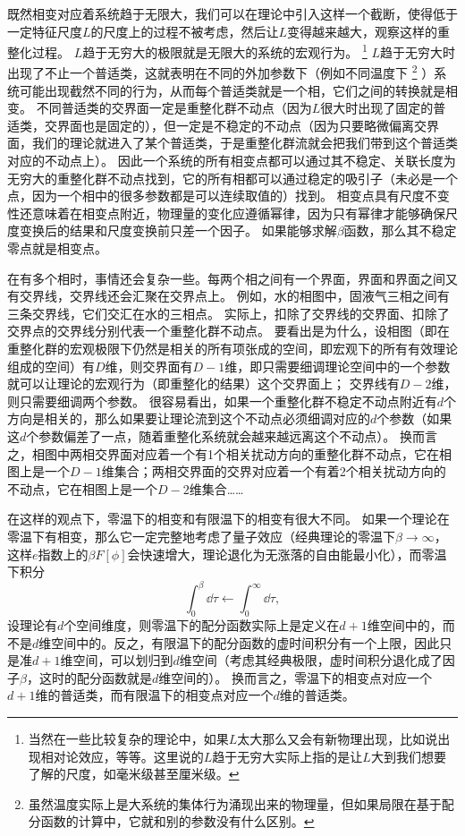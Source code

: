 \documentclass[hyperref, UTF8, a4paper]{ctexart}
\begin{document}
既然相变对应着系统趋于无限大，我们可以在理论中引入这样一个截断，使得低于一定特征尺度$L$的尺度上的过程不被考虑，然后让$L$变得越来越大，观察这样的重整化过程。
$L$趋于无穷大的极限就是无限大的系统的宏观行为。%
\footnote{当然在一些比较复杂的理论中，如果$L$太大那么又会有新物理出现，比如说出现相对论效应，等等。这里说的$L$趋于无穷大实际上指的是让$L$大到我们想要了解的尺度，如毫米级甚至厘米级。}%
$L$趋于无穷大时出现了不止一个普适类，这就表明在不同的外加参数下（例如不同温度下%
\footnote{虽然温度实际上是大系统的集体行为涌现出来的物理量，但如果局限在基于配分函数的计算中，它就和别的参数没有什么区别。}%
）系统可能出现截然不同的行为，从而每个普适类就是一个相，它们之间的转换就是相变。
不同普适类的交界面一定是重整化群不动点（因为$L$很大时出现了固定的普适类，交界面也是固定的），但一定是不稳定的不动点（因为只要略微偏离交界面，我们的理论就进入了某个普适类，于是重整化群流就会把我们带到这个普适类对应的不动点上）。
因此一个系统的所有相变点都可以通过其不稳定、关联长度为无穷大的重整化群不动点找到，它的所有相都可以通过稳定的吸引子（未必是一个点，因为一个相中的很多参数都是可以连续取值的）找到。
相变点具有尺度不变性还意味着在相变点附近，物理量的变化应遵循幂律，因为只有幂律才能够确保尺度变换后的结果和尺度变换前只差一个因子。%
如果能够求解$\beta$函数，那么其不稳定零点就是相变点。

在有多个相时，事情还会复杂一些。每两个相之间有一个界面，界面和界面之间又有交界线，交界线还会汇聚在交界点上。
例如，水的相图中，固液气三相之间有三条交界线，它们交汇在水的三相点。
实际上，扣除了交界线的交界面、扣除了交界点的交界线分别代表一个重整化群不动点。
要看出是为什么，设相图（即在重整化群的宏观极限下仍然是相关的所有项张成的空间，即宏观下的所有有效理论组成的空间）有$D$维，则交界面有$D-1$维，即只需要细调理论空间中的一个参数就可以让理论的宏观行为（即重整化的结果）这个交界面上；
交界线有$D-2$维，则只需要细调两个参数。
很容易看出，如果一个重整化群不稳定不动点附近有$d$个方向是相关的，那么如果要让理论流到这个不动点必须细调对应的$d$个参数（如果这$d$个参数偏差了一点，随着重整化系统就会越来越远离这个不动点）。
换而言之，相图中两相交界面对应着一个有1个相关扰动方向的重整化群不动点，它在相图上是一个$D-1$维集合；两相交界面的交界对应着一个有着2个相关扰动方向的不动点，它在相图上是一个$D-2$维集合……

在这样的观点下，零温下的相变和有限温下的相变有很大不同。
如果一个理论在零温下有相变，那么它一定完整地考虑了量子效应（经典理论的零温下$\beta \to \infty$，这样$e$指数上的$\beta F[\phi]$会快速增大，理论退化为无涨落的自由能最小化），而零温下积分
\[
    \int_0^\beta \dd{\tau} \longleftarrow \int_0^\infty \dd{\tau},
\]
设理论有$d$个空间维度，则零温下的配分函数实际上是定义在$d+1$维空间中的，而不是$d$维空间中的。反之，有限温下的配分函数的虚时间积分有一个上限，因此只是准$d+1$维空间，可以划归到$d$维空间（考虑其经典极限，虚时间积分退化成了因子$\beta$，这时的配分函数就是$d$维空间的）。
换而言之，零温下的相变点对应一个$d+1$维的普适类，而有限温下的相变点对应一个$d$维的普适类。
\end{document}
